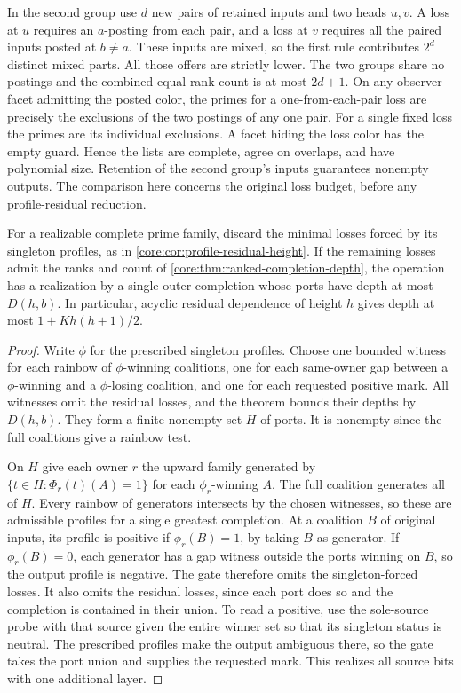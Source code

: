 In the second group use $d$ new pairs of retained inputs and
two heads $u,v$. A loss at $u$ requires an $a$-posting from
each pair, and a loss at $v$ requires all the paired inputs
posted at $b\ne a$. These inputs are mixed, so the first
rule contributes $2^d$ distinct mixed parts. All those offers
are strictly lower. The two groups share no postings and
the combined equal-rank count is at most $2d+1$.
On any observer facet admitting the posted color, the primes
for a one-from-each-pair loss are precisely the exclusions
of the two postings of any one pair. For a single fixed
loss the primes are its individual exclusions. A facet
hiding the loss color has the empty guard. Hence the lists
are complete, agree on overlaps, and have polynomial size.
Retention of the second group's inputs guarantees nonempty
outputs. The comparison here concerns the original loss
budget, before any profile-residual reduction.

\begin{corollary}
\label{core:cor:residual-completion-depth}
For a realizable complete prime family, discard the minimal losses
forced by its singleton profiles, as in
\cref{core:cor:profile-residual-height}. If the remaining losses admit
the ranks and count of \cref{core:thm:ranked-completion-depth}, the
operation has a realization by a single outer completion whose ports
have depth at most $D(h,b)$. In particular,
acyclic residual dependence of height $h$ gives depth at most
$1+Kh(h+1)/2$.
\end{corollary}
\begin{proof}
Write $\phi$ for the prescribed singleton profiles. Choose one bounded
witness for each rainbow of $\phi$-winning coalitions, one for each
same-owner gap between a $\phi$-winning and a $\phi$-losing coalition,
and one for each requested positive mark. All witnesses omit the
residual losses, and the theorem bounds their depths by $D(h,b)$.
They form a finite nonempty set $H$ of ports. It is nonempty since the
full coalitions give a rainbow test.

On $H$ give each owner $r$ the upward family generated by
$\{t\in H:\Phi_r(t)(A)=1\}$ for each $\phi_r$-winning $A$.
The full coalition generates all of $H$. Every rainbow of generators
intersects by the chosen witnesses, so these are admissible profiles
for a single greatest completion. At a coalition $B$ of original
inputs, its profile is positive if $\phi_r(B)=1$, by taking $B$ as
generator. If $\phi_r(B)=0$, each generator has a gap witness outside
the ports winning on $B$, so the output profile is negative.
The gate therefore omits the singleton-forced losses. It also omits
the residual losses, since each port does so and the completion is
contained in their union. To read a positive, use the sole-source
probe with that source given the entire winner set so that its
singleton status is neutral. The prescribed profiles make the
output ambiguous there, so the gate takes the port union and supplies
the requested mark. This realizes all source bits with one additional
layer.
\end{proof}

